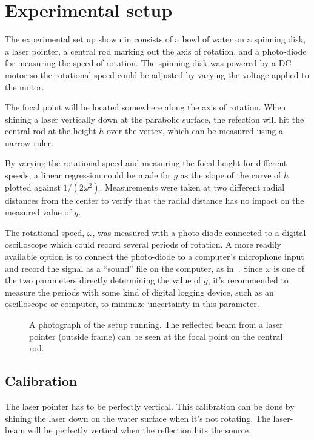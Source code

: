 \documentclass[11pt, a4paper, twocolumn, swedish, english]{article}
\begin{document}
\section{Experimental setup}

The experimental set up shown in  consists of a bowl of water
on a spinning disk, a laser pointer, a central rod marking out the axis of
rotation, and a photo-diode for measuring the speed of rotation. The spinning
disk was powered by a DC motor so the rotational speed could be
adjusted by varying the voltage applied to the motor. 

The focal point will be located somewhere along the axis of rotation. When
shining a laser vertically down at the parabolic surface, the refection will hit
the central rod at the height $h$ over the vertex, which can be measured
using a narrow ruler. 

By varying the rotational speed and measuring the focal height for
different speeds, a linear regression could be made for $g$ as the
slope of the curve of $h$ plotted against $1/(2\omega^2)$. 
Measurements were taken at two different radial distances from the
center to verify that the radial distance has no impact on the measured
value of $g$. 

The rotational speed, $\omega$, was measured with a photo-diode connected
to a digital oscilloscope which could record several periods of
rotation. A more readily available option is to connect the
photo-diode to a computer's microphone input and record the signal as a
``sound'' file on the computer, as in~\cite{Sabatka2010}. Since
$\omega$ is one of the two parameters directly determining the value
of $g$, it's recommended to measure the periods with some kind of
digital logging device, such as an oscilloscope or computer, to
minimize uncertainty in this parameter.

\begin{figure}
\centering
\resizebox{6cm}{!}{}
\caption{A photograph of the setup running. The
  reflected beam from a laser pointer (outside frame) can be seen at
  the focal point on the central rod. } 
\label{fig:rot_bowl_pic} 
\end{figure}

\subsection{Calibration}

The laser pointer has to be perfectly vertical. This calibration can be
done by shining the laser down on the water surface when it's not
rotating. The laser-beam will be perfectly vertical when the
reflection hits the source.
\end{document}
